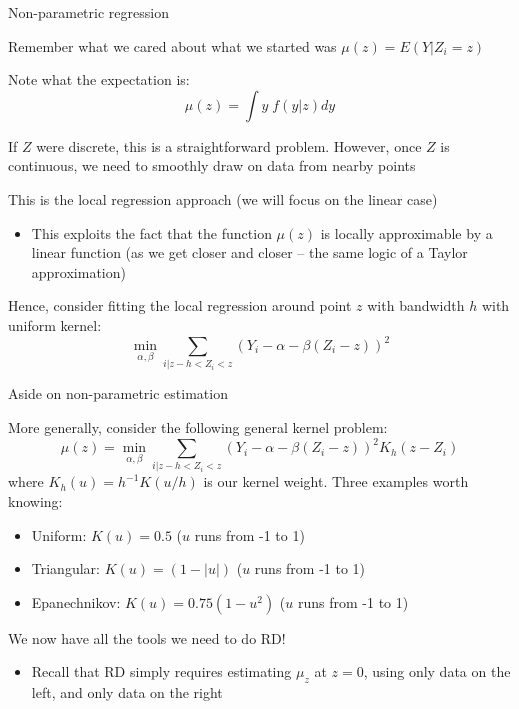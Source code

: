 \documentclass[notes,11pt, aspectratio=169]{beamer}
\newenvironment{wideitemize}{\itemize\addtolength{\itemsep}{10pt}}{\enditemize}
\begin{document}
\begin{frame}{Non-parametric regression}
  \begin{wideitemize}
  \item   Remember what we cared about what we started was $\mu(z) = E(Y| Z_{i} = z)$
  \item   Note what the expectation is:
  \begin{equation*}
    \mu(z) = \int y \; f(y | z) dy
  \end{equation*}
\item If $Z$ were discrete, this is a straightforward
  problem. However, once $Z$ is continuous, we need to smoothly draw
  on data from nearby points
\item This is the local regression approach (we will focus on the linear case)
  \begin{itemize}
  \item This exploits the fact that the function $\mu(z)$ is locally
    approximable by a linear function (as we get closer and closer --
    the same logic of a Taylor approximation)
  \end{itemize}
\item Hence, consider fitting the local regression around point $z$ with bandwidth $h$ with uniform kernel:
  \begin{equation}
    \min_{\alpha, \beta}\sum_{i | z-h < Z_{i} < z} (Y_{i} - \alpha - \beta (Z_{i} - z))^{2}
  \end{equation}
  \end{wideitemize}
\end{frame}


\begin{frame}{Aside on non-parametric estimation}
  \begin{wideitemize}
  \item More generally, consider the following general kernel problem:
    \begin{equation}
      \hat{\mu}(z) = \min_{\alpha, \beta}\sum_{i | z-h < Z_{i} < z} (Y_{i} - \alpha - \beta (Z_{i} - z))^{2} K_{h}(z - Z_{i})
    \end{equation}
    where $K_{h}(u) = h^{-1} K(u/h)$ is our kernel weight. Three examples worth knowing:
    \begin{itemize}
    \item Uniform: $K(u) = 0.5$ ($u$ runs from -1 to 1)
    \item Triangular: $K(u) = (1-|u|)$ ($u$ runs from -1 to 1)
    \item Epanechnikov: $K(u) = 0.75(1-u^{2})$ ($u$ runs from -1 to 1)    
    \end{itemize}
\item We now have all the tools we need to do RD!
  \begin{itemize}
  \item Recall that RD simply requires estimating $\mu_{z}$ at
    $z = 0$, using only data on the left, and only data on the right
  \end{itemize}
  \end{wideitemize}
  
\end{frame}
\end{document}
